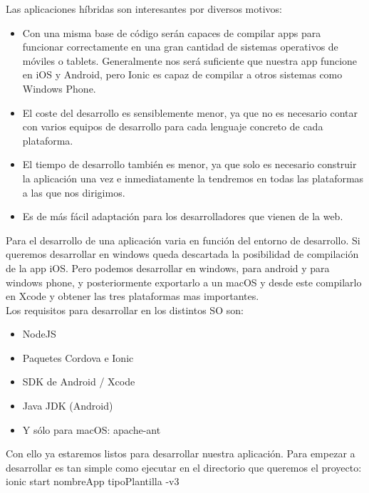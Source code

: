 \documentclass[a4paper, 11pt]{article}
\begin{document}
\begin{itemize}
            Las aplicaciones híbridas son interesantes por diversos motivos:
            \begin{itemize}
                \item{Con una misma base de código serán capaces de compilar apps
                para funcionar correctamente en una gran cantidad de sistemas
                operativos de móviles o tablets. Generalmente nos será suficiente
                que nuestra app funcione en iOS y Android, pero Ionic es capaz de
                compilar a otros sistemas como Windows Phone.}
                \item{El coste del desarrollo es sensiblemente menor, ya que no es
                necesario contar con varios equipos de desarrollo para cada lenguaje
                concreto de cada plataforma.}
                \item{El tiempo de desarrollo también es menor, ya que solo es
                necesario construir la aplicación una vez e inmediatamente la
                tendremos en todas las plataformas a las que nos dirigimos.}
                \item {Es de más fácil adaptación para los desarrolladores que
                vienen de la web.}
            \end{itemize}

            Para el desarrollo de una aplicación varia en función del entorno de
            desarrollo. Si queremos desarrollar en windows queda descartada la
            posibilidad de compilación de la app iOS. Pero podemos desarrollar en
            windows, para android y para windows phone, y posteriormente exportarlo
            a un macOS y desde este compilarlo en Xcode y obtener las tres
            plataformas mas importantes.\\

            Los requisitos para desarrollar en los distintos SO son:
            \begin{itemize}
                \item{NodeJS}
                \item{Paquetes Cordova e Ionic}
                \item{SDK de Android / Xcode}
                \item{Java JDK (Android)}
                \item{Y sólo para macOS: apache-ant}
            \end{itemize}

            Con ello ya estaremos listos para desarrollar nuestra aplicación. Para
            empezar a desarrollar es tan simple como ejecutar en el directorio que
            queremos el proyecto: ionic start nombreApp tipoPlantilla -v3\\


\end{itemize}
\end{document}
